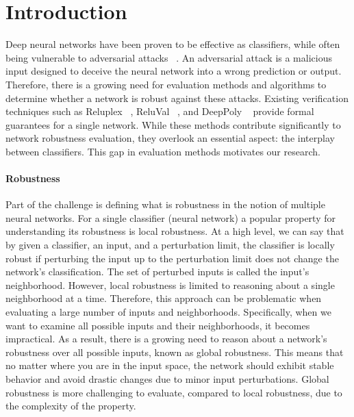 
\section{Introduction}
Deep neural networks have been proven to be effective as classifiers, while often being vulnerable to adversarial attacks ~\cite{INTPROP}. An adversarial attack is a malicious input designed to deceive the neural network into a wrong prediction or output. Therefore, there is a growing need for evaluation methods and algorithms to determine whether a network is robust against these attacks. Existing verification techniques such as Reluplex ~\cite{Reluplex}, ReluVal ~\cite{FORMALSEC}, and DeepPoly ~\cite{ABSTRACTINTER} provide formal guarantees for a single network. While these methods contribute significantly to network robustness evaluation, they overlook an essential aspect: the interplay between classifiers. This gap in evaluation methods motivates our research.


\paragraph{Robustness}
Part of the challenge is defining what is robustness in the notion of multiple neural networks. For a single classifier (neural network) a popular property for understanding its robustness is local robustness. At a high level, we can say that by given a classifier, an input, and a perturbation limit, the classifier is locally robust if perturbing the input up to the perturbation limit does not change the network’s classification. The set of perturbed inputs is called the input’s neighborhood. However, local robustness is limited to reasoning about a single neighborhood at a time. Therefore, this approach can be problematic when evaluating a large number of inputs and neighborhoods. Specifically, when we want to examine all possible inputs and their neighborhoods, it becomes impractical. As a result, there is a growing need to reason about a network’s robustness over all possible inputs, known as global robustness. This means that no matter where you are in the input space, the network should exhibit stable behavior and avoid drastic changes due to minor input perturbations. Global robustness is more challenging to evaluate, compared to local robustness, due to the complexity of the property. 


